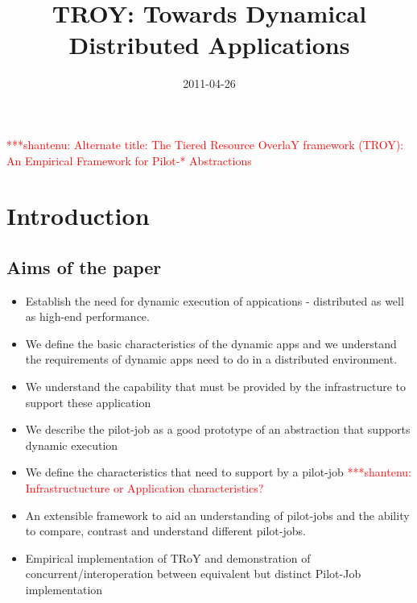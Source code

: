 \documentclass[]{article}
\title{TROY: Towards Dynamical Distributed Applications}
\author{  }
\date{2011-04-26}
\newcommand{\jhanote}[1]{ {\textcolor{red} { ***shantenu: #1 }}}
\begin{document}
\ifpdf
{}
\else
{}
\fi

\maketitle

\jhanote{Alternate title: The Tiered Resource OverlaY framework
  (TROY): An Empirical Framework for Pilot-* Abstractions}


\begin{abstract}

\end{abstract}

\section{Introduction}
\subsection{Aims of the paper}
\begin{itemize}

\item Establish the need for dynamic execution of appications -
  distributed as well as high-end performance.

\item We define the basic characteristics of the dynamic apps and we
  understand the requirements of dynamic apps need to do in a
  distributed environment.

\item We understand the capability that must be provided by the
  infrastructure to support these application

\item We describe the pilot-job as a good prototype of an abstraction
  that supports dynamic execution

\item We define the characteristics that need to support by a
  pilot-job \jhanote{Infrastructucture or Application
    characteristics?}

\item An extensible framework to aid an understanding of pilot-jobs
  and the ability to compare, contrast and understand different
  pilot-jobs.


\item Empirical implementation of TRoY and demonstration of
  concurrent/interoperation between equivalent but distinct Pilot-Job
  implementation 


\end{itemize}
\end{document}
